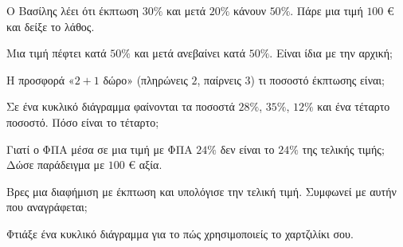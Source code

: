 
\ex Ο Βασίλης λέει ότι έκπτωση $30\%$ και μετά $20\%$ κάνουν $50\%$. Πάρε μια τιμή $100$ € και δείξε το λάθος.

\ex Μια τιμή πέφτει κατά $50\%$ και μετά ανεβαίνει κατά $50\%$. Είναι ίδια με την αρχική;

\ex Η προσφορά «$2+1$ δώρο» (πληρώνεις $2$, παίρνεις $3$) τι ποσοστό έκπτωσης είναι;

\ex Σε ένα κυκλικό διάγραμμα φαίνονται τα ποσοστά $28\%$, $35\%$, $12\%$ και ένα τέταρτο ποσοστό. Πόσο είναι το τέταρτο;

\ex Γιατί ο ΦΠΑ μέσα σε μια τιμή με ΦΠΑ $24\%$ δεν είναι το $24\%$ της τελικής τιμής; Δώσε παράδειγμα με $100$ € αξία.


\ex Βρες μια διαφήμιση με έκπτωση και υπολόγισε την τελική τιμή. Συμφωνεί με αυτήν που αναγράφεται;

\ex Φτιάξε ένα κυκλικό διάγραμμα για το πώς χρησιμοποιείς το χαρτζιλίκι σου.
